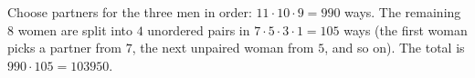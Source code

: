 Choose partners for the three men in order: $11\cdot10\cdot9=990$ ways. The remaining $8$ women are split into $4$ unordered pairs in $7\cdot5\cdot3\cdot1=105$ ways (the first woman picks a partner from $7$, the next unpaired woman from $5$, and so on). The total is $990\cdot105=\boxed{103950}$.
